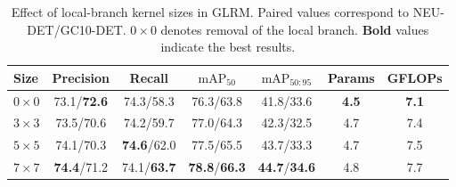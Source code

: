\documentclass[pdflatex,sn-nature]{sn-jnl}
\begin{document}
\begin{table}[!t]
\caption{Effect of local-branch kernel sizes in GLRM. Paired values correspond to NEU-DET/GC10-DET. $0\times0$ denotes removal of the local branch. \textbf{Bold} values indicate the best results.}
    \label{tab:glrm_kernel}
    \centering
    \footnotesize
    \setlength{\tabcolsep}{3pt}
    \renewcommand{\arraystretch}{1.1}
    \begin{tabular*}{\textwidth}
    {@{\extracolsep{\fill}}lcccccc@{}}
    \toprule
    Size &
    Precision &
    Recall &
    $\mathrm{mAP}_{50}$ &
    $\mathrm{mAP}_{50:95}$ &
    Params &
    GFLOPs\\
    \midrule
    $0\times0$
    & 73.1/\textbf{72.6}
    & 74.3/58.3
    & 76.3/63.8
    & 41.8/33.6
    & \textbf{4.5}
    & \textbf{7.1} \\

    $3\times3$
    & 73.5/70.6
    & 74.2/59.7
    & 77.0/64.3
    & 42.3/32.5
    & 4.7
    & 7.4 \\

    $5\times5$
    & 74.1/70.3
    & \textbf{74.6}/62.0
    & 77.5/65.5
    & 43.7/33.3
    & 4.7
    & 7.5 \\

    $7\times7$
    & \textbf{74.4}/71.2
    & 74.1/\textbf{63.7}
    & \textbf{78.8}/\textbf{66.3}
    & \textbf{44.7}/\textbf{34.6}
    & 4.8
    & 7.7 \\
    \bottomrule
    \end{tabular*}
\end{table}
\end{document}
